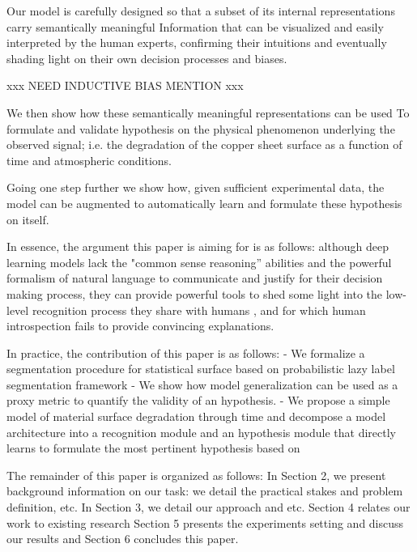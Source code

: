 \documentclass[10pt,twocolumn,letterpaper]{article}
\begin{document}
% 
Our model is carefully designed so that a subset of its internal representations carry semantically meaningful 
Information that can be visualized and easily interpreted by the human experts, confirming their intuitions 
and eventually shading light on their own decision processes and biases.

xxx NEED INDUCTIVE BIAS MENTION xxx

We then show how these semantically meaningful representations can be used
To formulate and validate hypothesis on the physical phenomenon underlying the observed signal; 
i.e. the degradation of the copper sheet surface as a function of time and atmospheric conditions.

Going one step further we show how, given sufficient experimental data, the model
can be augmented to automatically learn and formulate these hypothesis on itself.

In essence, the argument this paper is aiming for is as follows: although deep learning models 
lack the "common sense reasoning” abilities and the powerful formalism of natural language to communicate 
and justify for their decision making process, they can provide powerful tools to shed some light into the low-level
recognition process they share with humans \cite{xxx}, and for which human introspection fails to provide convincing explanations.

In practice, the contribution of this paper is as follows:
- We formalize a segmentation procedure for statistical surface based on probabilistic lazy label segmentation framework
- We show how model generalization can be used as a proxy metric to quantify the validity of an hypothesis.
- We propose a simple model of material surface degradation through time and decompose a model architecture
into a recognition module and an hypothesis module that directly learns to formulate the most pertinent hypothesis based on 

The remainder of this paper is organized as follows:
In Section 2, we present background information on our task: we detail the practical stakes and problem definition, etc.
In Section 3, we detail our approach and etc.
Section 4 relates our work to existing research
Section 5 presents the experiments setting and discuss our results and Section 6 concludes this paper.


\end{document}
